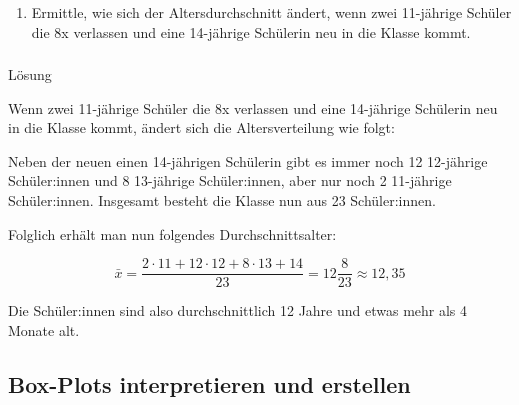\documentclass[
  ngerman,
]{book}
\providecommand{\tightlist}{%
  \setlength{\itemsep}{0pt}\setlength{\parskip}{0pt}}
\begin{document}
\hypertarget{section-25}{%
\subsubsection*{}\label{section-25}}

\begin{enumerate}
\def\labelenumi{\alph{enumi})}
\setcounter{enumi}{1}
\tightlist
\item
  Ermittle, wie sich der Altersdurchschnitt ändert, wenn zwei 11-jährige Schüler die 8x verlassen und eine 14-jährige Schülerin neu in die Klasse kommt.
\end{enumerate}

\hypertarget{section-26}{%
\subsubsection*{}\label{section-26}}

Lösung

Wenn zwei 11-jährige Schüler die 8x verlassen und eine 14-jährige Schülerin neu in die Klasse kommt, ändert sich die Altersverteilung wie folgt:

Neben der neuen einen 14-jährigen Schülerin gibt es immer noch 12 12-jährige Schüler:innen und 8 13-jährige Schüler:innen, aber nur noch 2 11-jährige Schüler:innen. Insgesamt besteht die Klasse nun aus 23 Schüler:innen.

Folglich erhält man nun folgendes Durchschnittsalter:

\[\bar{x}= \frac{2 \cdot 11 + 12 \cdot 12 + 8 \cdot 13 + 14}{23} = 12\frac{8}{23} \approx 12, 35\]

Die Schüler:innen sind also durchschnittlich 12 Jahre und etwas mehr als 4 Monate alt.

\hypertarget{section-27}{%
\subsubsection*{}\label{section-27}}

\hypertarget{section-28}{%
\subsubsection*{}\label{section-28}}

\hypertarget{box-plots-interpretieren-und-erstellen}{%
\subsection*{Box-Plots interpretieren und erstellen}\label{box-plots-interpretieren-und-erstellen}}
\end{document}
